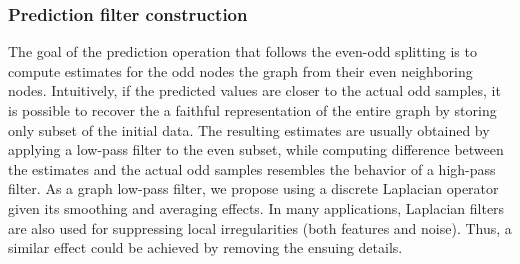 \documentclass[graybox]{svmult}
\begin{document}
\subsubsection{Prediction filter construction}
The goal of the prediction operation that follows the even-odd splitting is to compute estimates for the odd nodes the graph from their even neighboring nodes. Intuitively, if the predicted values are closer to the actual odd samples, it is possible to recover the a faithful representation of the entire graph by storing only subset of the initial data. The resulting estimates are usually obtained by applying a low-pass filter to the even subset, while computing difference between the estimates and the actual odd samples resembles the behavior of a high-pass filter. As a graph low-pass filter, we propose using a discrete Laplacian operator given its smoothing and averaging effects. In many applications, Laplacian filters are also used for suppressing local irregularities (both features and noise). Thus, a similar effect could be achieved by removing the ensuing details.
\end{document}
